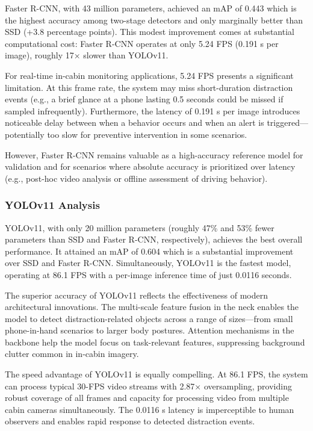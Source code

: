 \documentclass[conference]{IEEEtran}
\begin{document}
Faster R-CNN, with 43 million parameters, achieved an mAP of 0.443 which is the highest accuracy among two-stage detectors and only marginally better than SSD (+3.8 percentage points). This modest improvement comes at substantial computational cost: Faster R-CNN operates at only 5.24 FPS (0.191 s per image), roughly 17× slower than YOLOv11.

For real-time in-cabin monitoring applications, 5.24 FPS presents a significant limitation. At this frame rate, the system may miss short-duration distraction events (e.g., a brief glance at a phone lasting 0.5 seconds could be missed if sampled infrequently). Furthermore, the latency of 0.191 s per image introduces noticeable delay between when a behavior occurs and when an alert is triggered—potentially too slow for preventive intervention in some scenarios.

However, Faster R-CNN remains valuable as a high-accuracy reference model for validation and for scenarios where absolute accuracy is prioritized over latency (e.g., post-hoc video analysis or offline assessment of driving behavior).

\subsubsection{YOLOv11 Analysis}

YOLOv11, with only 20 million parameters (roughly 47\% and 53\% fewer parameters than SSD and Faster R-CNN, respectively), achieves the best overall performance. It attained an mAP of 0.604 which is a substantial improvement over SSD and Faster R-CNN. Simultaneously, YOLOv11 is the fastest model, operating at 86.1 FPS with a per-image inference time of just 0.0116 seconds.

The superior accuracy of YOLOv11 reflects the effectiveness of modern architectural innovations. The multi-scale feature fusion in the neck enables the model to detect distraction-related objects across a range of sizes—from small phone-in-hand scenarios to larger body postures. Attention mechanisms in the backbone help the model focus on task-relevant features, suppressing background clutter common in in-cabin imagery.

The speed advantage of YOLOv11 is equally compelling. At 86.1 FPS, the system can process typical 30-FPS video streams with 2.87× oversampling, providing robust coverage of all frames and capacity for processing video from multiple cabin cameras simultaneously. The 0.0116 s latency is imperceptible to human observers and enables rapid response to detected distraction events.
\end{document}
